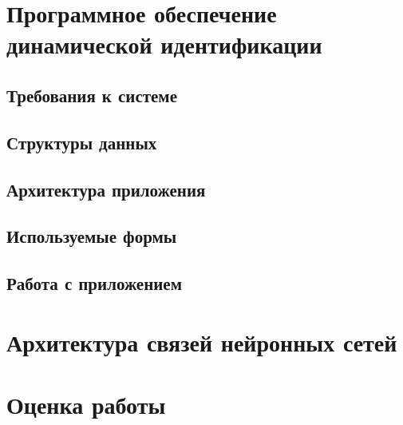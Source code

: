 \section{Программное обеспечение динамической идентификации}

\subsection{Требования к системе}

\subsection{Структуры данных}

\subsection{Архитектура приложения}

\subsection{Используемые формы}

\subsection{Работа с приложением}

\section{Архитектура связей нейронных сетей}

\section{Оценка работы}
